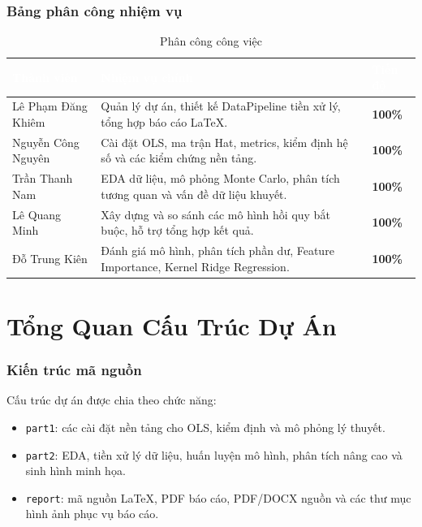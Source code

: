 \documentclass[12pt,a4paper]{article}
\newcommand{\tableheader}[1]{\textcolor{white}{\textbf{#1}}}
\newcommand{\bestcell}[1]{\textcolor{reportgreen}{\textbf{#1}}}
\begin{document}
\section{Bảng phân công nhiệm vụ}
\begin{table}[H]
\centering
\caption{Phân công công việc}
\setlength{\arrayrulewidth}{0.6pt}
\begin{tabular}{|L{3.1cm}|L{8.1cm}|C{2.6cm}|}
\hline
{}
\tableheader{Thành viên} & \tableheader{Nhiệm vụ chính} & \tableheader{Tiến độ} \\
\hline
Lê Phạm Đăng Khiêm & Quản lý dự án, thiết kế DataPipeline tiền xử lý, tổng hợp báo cáo \LaTeX. & \bestcell{100\%} \\
\hline
Nguyễn Công Nguyên & Cài đặt OLS, ma trận Hat, metrics, kiểm định hệ số và các kiểm chứng nền tảng. & \bestcell{100\%} \\
\hline
Trần Thanh Nam & EDA dữ liệu, mô phỏng Monte Carlo, phân tích tương quan và vấn đề dữ liệu khuyết. & \bestcell{100\%} \\
\hline
Lê Quang Minh & Xây dựng và so sánh các mô hình hồi quy bắt buộc, hỗ trợ tổng hợp kết quả. & \bestcell{100\%} \\
\hline
Đỗ Trung Kiên & Đánh giá mô hình, phân tích phần dư, Feature Importance, Kernel Ridge Regression. & \bestcell{100\%} \\
\hline
\end{tabular}
\end{table}

\part{Tổng Quan Cấu Trúc Dự Án}

\section{Kiến trúc mã nguồn}
Cấu trúc dự án được chia theo chức năng:
\begin{itemize}
    \item \texttt{part1}: các cài đặt nền tảng cho OLS, kiểm định và mô phỏng lý thuyết.
    \item \texttt{part2}: EDA, tiền xử lý dữ liệu, huấn luyện mô hình, phân tích nâng cao và sinh hình minh họa.
    \item \texttt{report}: mã nguồn \LaTeX, PDF báo cáo, PDF/DOCX nguồn và các thư mục hình ảnh phục vụ báo cáo.
\end{itemize}
\end{document}

